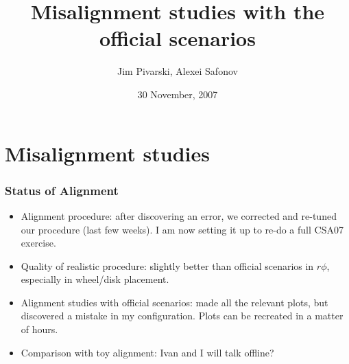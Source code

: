 \documentclass[compress]{beamer}
\title{Misalignment studies with the official scenarios}
\author{Jim Pivarski, Alexei Safonov}
\institute{Texas A\&M University}
\date{30 November, 2007}
\begin{document}
\frame{\titlepage}


\section*{Misalignment studies}

\begin{frame}
\frametitle{Status of Alignment}
\begin{itemize}\setlength{\itemsep}{0.5 cm}
\item Alignment procedure: after discovering an error, we corrected
and re-tuned our procedure (last few weeks).  I am now setting it up
to re-do a full CSA07 exercise.

\item Quality of realistic procedure: slightly better than official
scenarios in $r\phi$, especially in wheel/disk placement.

\item Alignment studies with official scenarios: made all the relevant
plots, but discovered a mistake in my configuration.  Plots can be
recreated in a matter of hours.

\item Comparison with toy alignment: Ivan and I will talk offline?
\end{itemize}
\end{frame}
\end{document}
